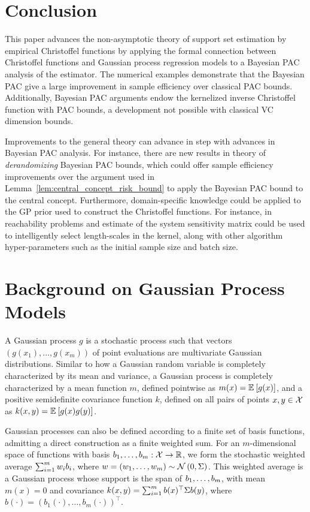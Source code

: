 \documentclass[onefignum,onetabnum]{siamart171218}
\begin{document}
\section{Conclusion}

This paper advances the non-asymptotic theory of support set estimation by
empirical Christoffel functions by applying the formal connection between
Christoffel functions and Gaussian process regression models to a Bayesian PAC
analysis of the estimator. 
The numerical examples demonstrate that the Bayesian
PAC give a large improvement in sample efficiency over classical PAC bounds.
Additionally, Bayesian PAC arguments endow the kernelized inverse Christoffel
function with PAC bounds, a development not possible
with classical VC dimension bounds.

Improvements to the general theory can advance in step with advances in Bayesian
PAC analysis. For instance, there are new results in theory of
\emph{derandomizing} Bayesian PAC bounds, which could offer sample efficiency
improvements over the argument used in
Lemma~\ref{lem:central_concept_risk_bound} to apply the Bayesian PAC bound to
the central concept. Furthermore, domain-specific knowledge could be applied to
the GP prior used to construct the Christoffel functions. For instance, in
reachability problems and estimate of the system sensitivity matrix could be
used to intelligently select length-scales in the kernel, along with other
algorithm hyper-parameters such as the initial sample size and batch size.




\appendix

\section{Background on Gaussian Process Models}%
\label{sub:gaussian_process_models}


A Gaussian process $g$ is a stochastic process such that vectors
$(g(x_1),\dotsc,g(x_m))$ of point evaluations are multivariate
Gaussian distributions. Similar to how a Gaussian random variable is completely
characterized by its mean and variance, a Gaussian process is completely
characterized by a mean function $m$, defined pointwise as $m(x)=\Ex{g(x)}$, and
a positive semidefinite covariance function $k$, defined on all pairs of points
$x,y\in\dom$ as $k(x,y)=\Ex{g(x)g(y)}$.

Gaussian processes can also be defined according to a finite set of basis functions,
admitting a direct construction as a finite weighted sum.
For an
$m$-dimensional
space of functions with basis $b_1,\dotsc,b_m:\dom\to\R$,
we form the stochastic weighted
average $\sumio{m} w_i b_i$, where $w=(\liston[m]{w})\sim\Norm{0,\Sigma}$.
This weighted average is a Gaussian process whose support is the span of
$\liston[m]{b}$, with mean $m(x)=0$ and covariance $k(x,y)=\sumio{m}b(x)^\top
\Sigma b(y)$, where $b(\cdot) = (b_1(\cdot),\dotsc,b_m(\cdot))^\top$.
\end{document}
